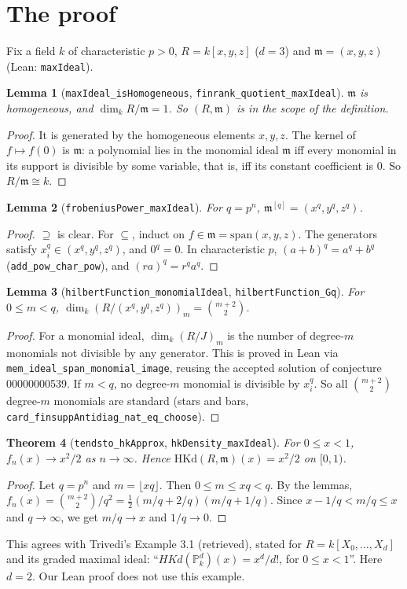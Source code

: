 \documentclass[11pt]{article}
\newtheorem{theorem}{Theorem}
\newtheorem{lemma}[theorem]{Lemma}
\theoremstyle{definition}
\theoremstyle{remark}
\newcommand{\HKd}{\mathrm{HKd}}
\begin{document}
\section{The proof}

Fix a field $k$ of characteristic $p>0$, $R=k[x,y,z]$ ($d=3$) and $\mathfrak m=(x,y,z)$
(Lean: \texttt{maxIdeal}).

\begin{lemma}[\texttt{maxIdeal\_isHomogeneous}, \texttt{finrank\_quotient\_maxIdeal}]
$\mathfrak m$ is homogeneous, and $\dim_k R/\mathfrak m=1$. So $(R,\mathfrak m)$ is in the scope of the definition.
\end{lemma}
\begin{proof}
It is generated by the homogeneous elements $x,y,z$. The kernel of $f\mapsto f(0)$ is $\mathfrak m$: a polynomial
lies in the monomial ideal $\mathfrak m$ iff every monomial in its support is divisible by some variable, that is,
iff its constant coefficient is $0$. So $R/\mathfrak m\cong k$.
\end{proof}

\begin{lemma}[\texttt{frobeniusPower\_maxIdeal}]
For $q=p^n$, $\mathfrak m^{[q]}=(x^q,y^q,z^q)$.
\end{lemma}
\begin{proof}
$\supseteq$ is clear. For $\subseteq$, induct on $f\in\mathfrak m=\mathrm{span}(x,y,z)$. The generators satisfy
$x_i^q\in(x^q,y^q,z^q)$, and $0^q=0$. In characteristic $p$, $(a+b)^q=a^q+b^q$ (\texttt{add\_pow\_char\_pow}), and
$(ra)^q=r^qa^q$.
\end{proof}

\begin{lemma}[\texttt{hilbertFunction\_monomialIdeal}, \texttt{hilbertFunction\_Gq}]
For $0\le m<q$, $\dim_k (R/(x^q,y^q,z^q))_m=\binom{m+2}{2}$.
\end{lemma}
\begin{proof}
For a monomial ideal, $\dim_k(R/J)_m$ is the number of degree-$m$ monomials not divisible by any generator. This is
proved in Lean via \texttt{mem\_ideal\_span\_monomial\_image}, reusing the accepted solution of conjecture 00000000539.
If $m<q$, no degree-$m$ monomial is divisible by $x_i^q$. So all $\binom{m+2}{2}$ degree-$m$ monomials are standard
(stars and bars, \texttt{card\_finsuppAntidiag\_nat\_eq\_choose}).
\end{proof}

\begin{theorem}[\texttt{tendsto\_hkApprox}, \texttt{hkDensity\_maxIdeal}]
For $0\le x<1$, $f_n(x)\to x^2/2$ as $n\to\infty$. Hence $\HKd(R,\mathfrak m)(x)=x^2/2$ on $[0,1)$.
\end{theorem}
\begin{proof}
Let $q=p^n$ and $m=\lfloor xq\rfloor$. Then $0\le m\le xq<q$. By the lemmas,
$f_n(x)=\binom{m+2}{2}/q^2=\tfrac12(m/q+2/q)(m/q+1/q)$. Since $x-1/q<m/q\le x$ and $q\to\infty$, we get
$m/q\to x$ and $1/q\to0$.
\end{proof}
This agrees with Trivedi's Example 3.1 (retrieved), stated for $R=k[X_0,\dots,X_d]$ and its graded maximal ideal:
``$HKd({\mathbb{P}}^{d}_{k})(x)=x^{d}/d!$, for $0\leq x<1$''. Here $d=2$. Our Lean proof does not use this example.
\end{document}
